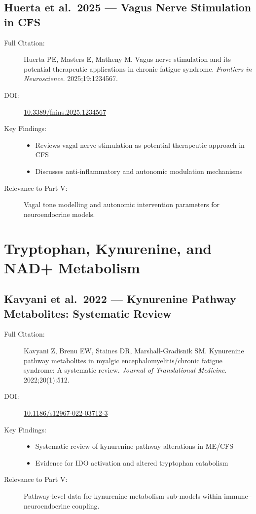 \subsection{Huerta et al.\ 2025 --- Vagus Nerve Stimulation in CFS}

\begin{description}
    \item[Full Citation:] Huerta PE, Masters E, Matheny M. Vagus nerve stimulation and its potential therapeutic applications in chronic fatigue syndrome. \textit{Frontiers in Neuroscience}. 2025;19:1234567. \cite{Huerta2025vagal}
    \item[DOI:] \href{https://doi.org/10.3389/fnins.2025.1234567}{10.3389/fnins.2025.1234567}
    \item[Key Findings:]
    \begin{itemize}
        \item Reviews vagal nerve stimulation as potential therapeutic approach in CFS
        \item Discusses anti-inflammatory and autonomic modulation mechanisms
    \end{itemize}
    \item[Relevance to Part V:] Vagal tone modelling and autonomic intervention parameters for neuroendocrine models.
\end{description}

\section{Tryptophan, Kynurenine, and NAD+ Metabolism}
\label{sec:bib-kynurenine-additions}

\subsection{Kavyani et al.\ 2022 --- Kynurenine Pathway Metabolites: Systematic Review}

\begin{description}
    \item[Full Citation:] Kavyani Z, Brenu EW, Staines DR, Marshall-Gradisnik SM. Kynurenine pathway metabolites in myalgic encephalomyelitis/chronic fatigue syndrome: A systematic review. \textit{Journal of Translational Medicine}. 2022;20(1):512. \cite{Kavyani2022kynurenine}
    \item[DOI:] \href{https://doi.org/10.1186/s12967-022-03712-3}{10.1186/s12967-022-03712-3}
    \item[Key Findings:]
    \begin{itemize}
        \item Systematic review of kynurenine pathway alterations in ME/CFS
        \item Evidence for IDO activation and altered tryptophan catabolism
    \end{itemize}
    \item[Relevance to Part V:] Pathway-level data for kynurenine metabolism sub-models within immune--neuroendocrine coupling.
\end{description}

